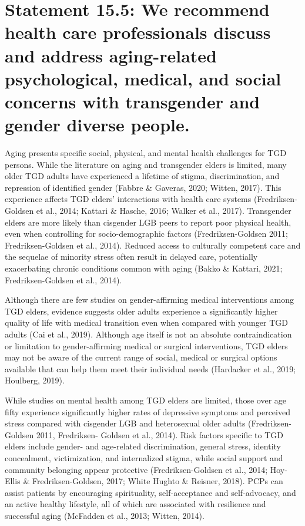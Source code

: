 \documentclass[
]{book}
\begin{document}
\hypertarget{statement-15.5-we-recommend-health-care-professionals-discuss-and-address-aging-related-psychological-medical-and-social-concerns-with-transgender-and-gender-diverse-people.}{%
\section*{Statement 15.5: We recommend health care professionals discuss and address aging-related psychological, medical, and social concerns with transgender and gender diverse people.}\label{statement-15.5-we-recommend-health-care-professionals-discuss-and-address-aging-related-psychological-medical-and-social-concerns-with-transgender-and-gender-diverse-people.}}

Aging presents specific social, physical, and
mental health challenges for TGD persons. While
the literature on aging and transgender elders is
limited, many older TGD adults have experienced
a lifetime of stigma, discrimination, and repression of identified gender (Fabbre \& Gaveras,
2020; Witten, 2017). This experience affects TGD
elders' interactions with health care systems
(Fredriksen-Goldsen et al., 2014; Kattari \&
Hasche, 2016; Walker et al., 2017). Transgender
elders are more likely than cisgender LGB peers
to report poor physical health, even when controlling for socio-demographic factors
(Fredriksen-Goldsen 2011; Fredriksen-Goldsen
et al., 2014). Reduced access to culturally competent care and the sequelae of minority stress
often result in delayed care, potentially exacerbating chronic conditions common with aging
(Bakko \& Kattari, 2021; Fredriksen-Goldsen
et al., 2014).

Although there are few studies on
gender-affirming medical interventions among
TGD elders, evidence suggests older adults experience a significantly higher quality of life with
medical transition even when compared with
younger TGD adults (Cai et al., 2019). Although
age itself is not an absolute contraindication or
limitation to gender-affirming medical or surgical
interventions, TGD elders may not be aware of
the current range of social, medical or surgical
options available that can help them meet their
individual needs (Hardacker et al., 2019;
Houlberg, 2019).

While studies on mental health among TGD
elders are limited, those over age fifty experience
significantly higher rates of depressive symptoms
and perceived stress compared with cisgender
LGB and heterosexual older adults
(Fredriksen-Goldsen 2011, Fredriksen-
Goldsen et al., 2014). Risk factors specific to
TGD elders include gender- and age-related discrimination, general stress, identity concealment,
victimization, and internalized stigma, while
social support and community belonging appear
protective (Fredriksen-Goldsen et al., 2014;
Hoy-Ellis \& Fredriksen-Goldsen, 2017; White
Hughto \& Reisner, 2018). PCPs can assist patients
by encouraging spirituality, self-acceptance and
self-advocacy, and an active healthy lifestyle, all
of which are associated with resilience and successful aging (McFadden et al., 2013; Witten, 2014).
\end{document}
